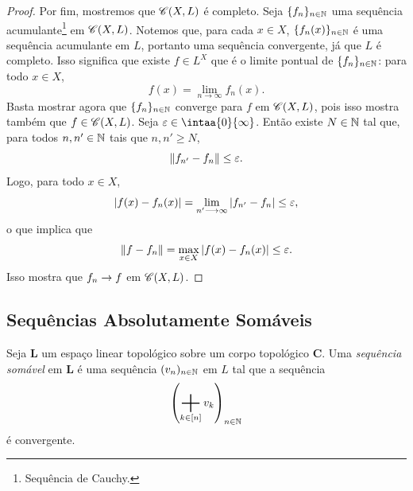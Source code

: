\begin{proof}
Por fim, mostremos que $\mathscr{C}(X,L)$ é completo. Seja $\{f_n\}_{n \in \mathbb{N}}$ uma sequência acumulante\footnote{Sequência de Cauchy.} em $\mathscr{C}(X,L)$.
Notemos que, para cada $x \in X$, $\{f_n(x)\}_{n \in \mathbb{N}}$ é uma sequência acumulante em $L$, portanto uma sequência convergente, já que $L$ é completo. Isso significa que existe $f \in L^X$ que é o limite pontual de $\{f_n\}_{n \in \mathbb{N}}$: para todo $x \in X$,
	\begin{equation*}
	f(x) = \lim_{n \to \infty} f_n(x).
	\end{equation*}
Basta mostrar agora que $\{f_n\}_{n \in \mathbb{N}}$ converge para $f$ em $\mathscr{C}(X,L)$, pois isso mostra também que $f \in \mathscr{C}(X,L)$. Seja $\varepsilon \in \intaa{0}{\infty}$. Então existe $N \in \mathbb{N}$ tal que, para todos $n,n' \in \mathbb{N}$ tais que $n,n' \geq N$,
	\begin{equation*}
	\left\Vert{f_{n'} - f_n}\right\Vert \leq \varepsilon.
	\end{equation*}
Logo, para todo $x \in X$,
	\begin{equation*}
	\left\vert{f(x) - f_n(x)}\right\vert = \lim_{n' \longrightarrow \infty} \left\vert{f_{n'} - f_n}\right\vert \leq \varepsilon,
	\end{equation*}
o que implica que
	\begin{equation*}
	\left\Vert{f-f_n}\right\Vert = \max_{x \in X} \left\vert{f(x)-f_n(x)}\right\vert \leq \varepsilon.
	\end{equation*}
Isso mostra que $f_n \rightarrow f$ em $\mathscr{C}(X,L)$.
\end{proof}





\subsection{Sequências Absolutamente Somáveis}

\begin{defi}
Seja $\bm L$ um espaço linear topológico sobre um corpo topológico $\bm C$. Uma \emph{sequência somável} em $\bm L$ é uma sequência $(v_n)_{n \in \mathbb{N}}$ em $L$ tal que a sequência
	\begin{equation*}
	\left( \sum_{k \in [n]} v_k \right)_{n \in \N}
	\end{equation*}
é convergente.
\end{defi}

